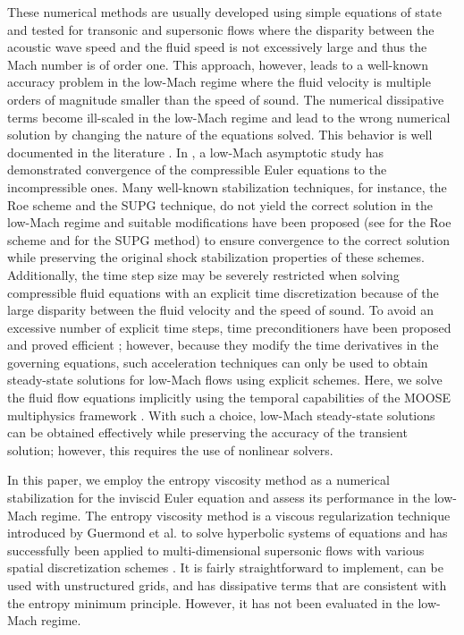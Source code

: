 \documentclass[review,10pt]{elsarticle}
\begin{document}
These numerical methods are usually developed using simple equations 
of state and tested for transonic and supersonic flows where the disparity between the acoustic wave speed and the fluid speed is not 
excessively large and thus the Mach number is of order one. This approach, however, leads to a well-known accuracy problem in the low-Mach regime 
where the fluid velocity is multiple orders of magnitude smaller than the speed of sound. The numerical dissipative terms become 
ill-scaled in the low-Mach regime and lead to the wrong numerical solution by changing the nature of the equations solved. This 
behavior is well documented in the literature \cite{LowMach1, LowMach2, LowMach3}.
In \cite{LowMach1}, a low-Mach asymptotic study has demonstrated convergence of the 
compressible Euler equations to the incompressible ones. 
Many well-known stabilization techniques, for instance, the Roe scheme and the SUPG technique,
do not yield the correct solution in the low-Mach regime and suitable modifications have been proposed (see \cite{Roe} for the Roe scheme and \cite{LowMach3} for the SUPG method)
to ensure convergence to the correct solution while preserving the original shock stabilization 
properties of these schemes. 
%
Additionally, the time step size may be severely restricted when solving compressible fluid equations with an explicit time discretization 
because of the large disparity between the fluid velocity and the speed of sound. 
To avoid an excessive number of explicit time steps, time preconditioners have been proposed and proved efficient \cite{LowMach2};
however, because they modify the time derivatives in the governing equations, such acceleration techniques can only be used to obtain
steady-state solutions for low-Mach flows using explicit schemes.
%
Here, we solve the fluid flow equations implicitly using the temporal capabilities of the MOOSE multiphysics framework \cite{MOOSE}. With such a choice, low-Mach steady-state solutions 
can be obtained effectively while preserving the accuracy of the transient solution; however, this requires the use of nonlinear solvers.

In this paper, we employ the entropy viscosity method as a numerical stabilization for the inviscid Euler equation and assess its performance 
in the low-Mach regime. 
The entropy viscosity method is a viscous regularization technique introduced by Guermond et al. to solve hyperbolic systems of equations
and has successfully been applied to multi-dimensional supersonic flows with various spatial discretization schemes \cite{jlg}. 
It is fairly straightforward to implement, can be used with unstructured grids, and has dissipative terms that are consistent with the 
entropy minimum principle. However, it has not been evaluated in the low-Mach regime.
\end{document}
